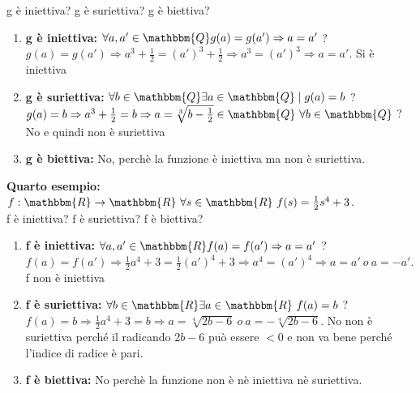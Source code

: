 \documentclass[12pt, letterpaper]{report}
\begin{document}
	g è iniettiva? g è suriettiva? g è biettiva?
	\begin{enumerate}
		\item \textbf{g è iniettiva:} $\forall a, a' \in \mathbbm{Q} g(a) = g(a') \Rightarrow a = a' $ ?
		\\
		$g(a) = g(a') \Rightarrow a^3 + \frac{1}{2} = (a')^3 + \frac{1}{2} \Rightarrow a^3 = (a')^3 \Rightarrow a = a'$. Si è iniettiva
		\item \textbf{g è suriettiva:} $\forall b \in \mathbbm{Q} \exists a \in \mathbbm{Q} \mid g(a) = b$ ?
		\\
		$g(a) = b \Rightarrow a^3 + \frac{1}{2} = b \Rightarrow a = \sqrt[3]{b - \frac{1}{2}} \in \mathbbm{Q} \ \forall b \in \mathbbm{Q}$ ? No e quindi non è suriettiva
		\item \textbf{g è biettiva:} No, perchè la funzione è iniettiva ma non è suriettiva.
	\end{enumerate}

	\textbf{Quarto esempio: }
	\\
	$f: \mathbbm{R} \to \mathbbm{R} \ \forall s \in \mathbbm{R} \ f(s) = \frac{1}{2}s^4 + 3$.
	\\
	f è iniettiva? f è suriettiva? f è biettiva?
	\begin{enumerate}
		\item \textbf{f è iniettiva:} $\forall a, a' \in \mathbbm{R} f(a) = f(a') \Rightarrow a = a'$ ?
		\\
		$f(a) = f(a') \Rightarrow \frac{1}{2}a^4 + 3 = \frac{1}{2}(a')^4 + 3 \Rightarrow a^4 = (a')^4 \Rightarrow a = a' \ o \ a = -a'$. f non è iniettiva
		\item \textbf{f è suriettiva:} 	$\forall b \in \mathbbm{R} \exists a \in \mathbbm{R} \ f(a) = b$ ?
		\\
		$f(a) = b \Rightarrow \frac{1}{2}a^4 + 3 = b \Rightarrow a = \sqrt[4]{2b - 6} \ o \ a = -\sqrt[4]{2b - 6}$. No non è suriettiva perché il radicando $2b - 6$ può essere $< 0$ e non va bene perché l'indice di radice è pari.
		\item \textbf{f è biettiva:} No perchè la funzione non è nè iniettiva nè suriettiva.
	\end{enumerate}
\end{document}
